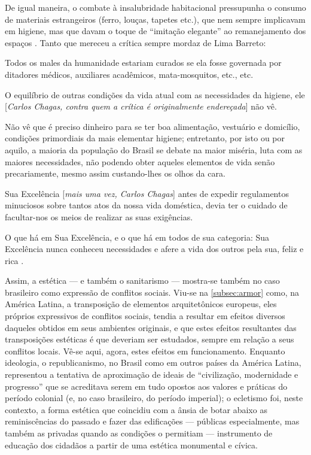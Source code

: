 De igual maneira, o combate à insalubridade habitacional pressupunha o consumo de materiais estrangeiros (ferro, louças, tapetes etc.), que nem sempre implicavam em higiene, mas que davam o toque de ``imitação elegante'' ao remanejamento dos espaços \cite[p.~38]{sodre_terreiro_1988}. Tanto que mereceu a crítica sempre mordaz de Lima Barreto:

\begin{citacao}
Todos os males da humanidade estariam curados se ela fosse governada por ditadores médicos, auxiliares acadêmicos, mata-mosquitos, etc., etc.

O equilíbrio de outras condições da vida atual com as necessidades da higiene, ele [\textit{Carlos Chagas, contra quem a crítica é originalmente endereçada}] não vê.

Não vê que é preciso dinheiro para se ter boa alimentação, vestuário e domicílio, condições primordiais da mais elementar higiene; entretanto, por isto ou por aquilo, a maioria da população do Brasil se debate na maior miséria, luta com as maiores necessidades, não podendo obter aqueles elementos de vida senão precariamente, mesmo assim custando-lhes os olhos da cara.

Sua Excelência [\textit{mais uma vez, Carlos Chagas}] antes de expedir regulamentos minuciosos sobre tantos atos da nossa vida doméstica, devia ter o cuidado de facultar-nos os meios de realizar as suas exigências.

O que há em Sua Excelência, e o que há em todos de sua categoria: Sua Excelência nunca conheceu necessidades e afere a vida dos outros pela sua, feliz e rica \cite{limabarreto_higienistas_2001}.
\end{citacao}

Assim, a estética --- e também o sanitarismo --- mostra-se também no caso brasileiro como expressão de conflitos sociais. Viu-se na \autoref{subsec:armor} como, na América Latina, a transposição de elementos arquitetônicos europeus, eles próprios expressivos de conflitos sociais, tendia a resultar em efeitos diversos daqueles obtidos em seus ambientes originais, e que estes efeitos resultantes das transposições estéticas é que deveriam ser estudados, sempre em relação a seus conflitos locais. Vê-se aqui, agora, estes efeitos em funcionamento. Enquanto ideologia, o republicanismo, no Brasil como em outros países da América Latina, representou a tentativa de aproximação de ideais de ``civilização, modernidade e progresso'' que se acreditava serem em tudo opostos aos valores e práticas do período colonial (e, no caso brasileiro, do período imperial); o ecletismo foi, neste contexto, a forma estética que coincidiu com a ânsia de botar abaixo as reminiscências do passado e fazer das edificações --- públicas especialmente, mas também as privadas quando as condições o permitiam --- instrumento de educação dos cidadãos a partir de uma estética monumental e cívica. 


